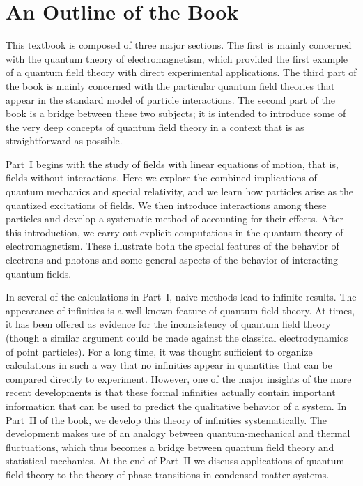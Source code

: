 \section*{An Outline of the Book}

This textbook is composed of three major sections.  The first is mainly
concerned with the quantum theory of electromagnetism, which provided the
first example of a quantum field theory with direct experimental
applications.  The third part of the book is mainly concerned with the
particular quantum field theories that appear in the standard model of
particle interactions.  The second part of the book is a bridge between
these two subjects; it is intended to introduce some of the very deep
concepts of quantum field theory in a context that is as straightforward
as possible.

Part~I begins with the study of fields with linear equations of motion,
that is, fields without interactions.  Here we explore the combined
implications of quantum mechanics and special relativity, and we learn how
particles arise as the quantized excitations of fields.  We then introduce
interactions among these particles and develop a systematic method of
accounting for their effects.  After this introduction, we carry out
explicit computations in the quantum theory of electromagnetism.  These
illustrate both the special features of the behavior of electrons and
photons and some general aspects of the behavior of interacting quantum
fields.

In several of the calculations in Part~I, naive methods lead to infinite
results.  The appearance of infinities is a well-known feature of quantum
field theory.  At times, it has been offered as evidence for the
inconsistency of quantum field theory (though a similar argument could be
made against the classical electrodynamics of point particles).  For a long
time, it was thought sufficient to organize calculations in such a way that
no infinities appear in quantities that can be compared directly to
experiment.  However, one of the major insights of the more recent
developments is that these formal infinities actually contain important
information that can be used to predict the qualitative behavior of a
system.  In Part~II of the book, we develop this theory of infinities
systematically.  The development makes use of an analogy between
quantum-mechanical and thermal fluctuations, which thus becomes a bridge
between quantum field theory and statistical mechanics.  At the end of
Part~II we discuss applications of quantum field theory to the theory of
phase transitions in condensed matter systems.

